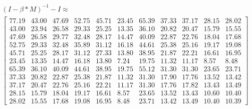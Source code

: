 \begin{gather}
	\nonumber (I - \beta * M)^{-1} - I \approx\\
	 \begin{bmatrix}
		77.19 & 43.00 & 47.69 & 52.75 & 45.71 & 23.45 & 65.39 & 37.33 & 37.17 & 28.15 & 28.02\\
		43.00 & 23.94 & 26.58 & 29.33 & 25.25 & 13.35 & 36.10 & 20.82 & 20.47 & 15.79 & 15.55\\
		47.69 & 26.58 & 29.77 & 32.48 & 28.17 & 14.47 & 40.09 & 22.87 & 22.76 & 18.04 & 17.68\\
		52.75 & 29.33 & 32.48 & 35.89 & 31.12 & 16.18 & 44.61 & 25.38 & 25.16 & 19.17 & 19.08\\
		45.71 & 25.25 & 28.17 & 31.12 & 27.33 & 13.80 & 38.95 & 21.87 & 22.21 & 16.61 & 16.95\\
		23.45 & 13.35 & 14.47 & 16.18 & 13.80 & 7.24 & 19.75 & 11.32 & 11.17 & 8.57 & 8.48\\
		65.39 & 36.10 & 40.09 & 44.61 & 38.95 & 19.75 & 55.12 & 31.30 & 31.30 & 23.65 & 23.71\\
		37.33 & 20.82 & 22.87 & 25.38 & 21.87 & 11.32 & 31.30 & 17.90 & 17.76 & 13.52 & 13.42\\
		37.17 & 20.47 & 22.76 & 25.16 & 22.21 & 11.17 & 31.30 & 17.76 & 17.82 & 13.43 & 13.49\\
		28.15 & 15.79 & 18.04 & 19.17 & 16.61 & 8.57 & 23.65 & 13.52 & 13.43 & 10.60 & 10.40\\
		28.02 & 15.55 & 17.68 & 19.08 & 16.95 & 8.48 & 23.71 & 13.42 & 13.49 & 10.40 & 10.39
	\end{bmatrix}
	\label{frml:katzZentralitaetPseudoMitarbeiter:formel5}
\end{gather}
